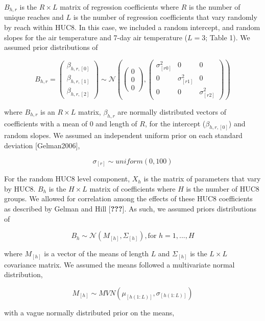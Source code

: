 \(B_{h,r}\) is the \(R \times L\) matrix of regression coefficients
where \(R\) is the number of unique reaches and \(L\) is the number of
regression coefficients that vary randomly by reach within HUC8. In this
case, we included a random intercept, and random slopes for the air
temperature and 7-day air temperature (\(L = 3\); Table 1). We assumed
prior distributions of

\[ 
B_{h,r} = \left( \begin{array}{c} \beta_{h,r,[0]} \\ \beta_{h,r,[1]} \\ \beta_{h,r,[2]} \end{array} \right) \sim \mathcal{N}\left(\left(\begin{array}{c} 0 \\ 0 \\ 0 \end{array} \right), \left( \begin{array}{ccc} \sigma_{[r0]}^2 & 0 & 0 \\ 0 & \sigma_{[r1]}^2 & 0 \\ 0 & 0 & \sigma_{[r2]}^2 \end{array} \right) \right)
\]

where \(B_{h,r}\) is an \(R \times L\) matrix, \(\beta_{h,r}\) are
normally distributed vectors of coefficients with a mean of 0 and length
of \(R\), for the intercept (\(\beta_{h,r,[0]}\)) and random slopes. We
assumed an independent uniform prior on each standard deviation
{[}Gelman2006{]},

\[ 
\sigma_{[r]} \sim uniform(0,100)
\]

For the random HUC8 level component, \(X_{h}\) is the matrix of
parameters that vary by HUC8. \(B_{h}\) is the \(H \times L\) matrix of
coefficients where \(H\) is the number of HUC8 groups. We allowed for
correlation among the effects of these HUC8 coefficients as described by
Gelman and Hill {[}{\textbf{???}}{]}. As such, we assumed priors
distributions of

\[ B_{h} \sim \mathcal{N}(M_{[h]},\Sigma_{[h]}), \text{for $h = 1,...,H$} \]

where \(M_{[h]}\) is a vector of the means of length \(L\) and
\(\Sigma_{[h]}\) is the \(L \times L\) covariance matrix. We assumed the
means followed a multivariate normal distribution,

\[ M_{[h]} \sim MVN(\mu_{[h(1:L)]}, \sigma_{[h(1:L)]}) \]

with a vague normally distributed prior on the means,

